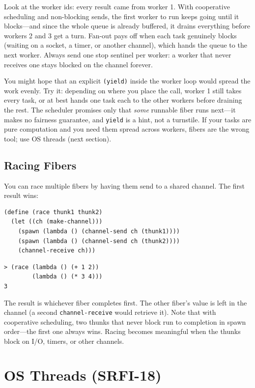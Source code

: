 Look at the worker ids: every result came from worker 1. With cooperative scheduling and non-blocking sends, the first worker to run keeps going until it blocks---and since the whole queue is already buffered, it drains everything before workers 2 and 3 get a turn. Fan-out pays off when each task genuinely blocks (waiting on a socket, a timer, or another channel), which hands the queue to the next worker. Always send one stop sentinel per worker: a worker that never receives one stays blocked on the channel forever.

You might hope that an explicit \texttt{(yield)} inside the worker loop would spread the work evenly. Try it: depending on where you place the call, worker 1 still takes every task, or at best hands one task each to the other workers before draining the rest. The scheduler promises only that \emph{some} runnable fiber runs next---it makes no fairness guarantee, and \texttt{yield} is a hint, not a turnstile. If your tasks are pure computation and you need them spread across workers, fibers are the wrong tool; use OS threads (next section).

\subsection{Racing Fibers}

You can race multiple fibers by having them send to a shared channel. The first result wins:

\begin{lstlisting}
(define (race thunk1 thunk2)
  (let ((ch (make-channel)))
    (spawn (lambda () (channel-send ch (thunk1))))
    (spawn (lambda () (channel-send ch (thunk2))))
    (channel-receive ch)))
\end{lstlisting}

\begin{lstlisting}[style=repl]
> (race (lambda () (+ 1 2))
        (lambda () (* 3 4)))
3
\end{lstlisting}

The result is whichever fiber completes first. The other fiber's value is left in the channel (a second \texttt{channel-receive} would retrieve it). Note that with cooperative scheduling, two thunks that never block run to completion in spawn order---the first one always wins. Racing becomes meaningful when the thunks block on I/O, timers, or other channels.

\section{OS Threads (SRFI-18)}

